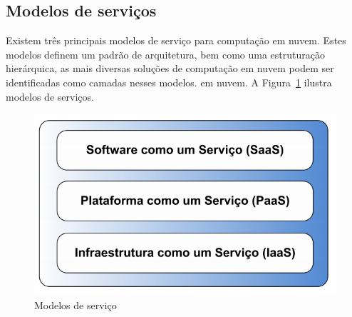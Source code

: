\documentclass[twoside,english,brazilian]{UNISINOSmonografia}
\begin{document}
\subsection{Modelos de serviços}
Existem três principais modelos de serviço para computação em nuvem. Estes modelos definem um padrão de arquitetura, bem como uma estruturação hierárquica, as mais diversas soluções de computação em nuvem podem ser identificadas como camadas nesses modelos. 
em nuvem. A Figura~\ref{fig:saas_paas} ilustra modelos de serviços.

\begin{figure}
	\caption{Modelos de serviço}
	\label{fig:saas_paas}
	\centering%
	\begin{minipage}{.4\textwidth}
		\includegraphics[width=\textwidth]{saas_paas}
	\end{minipage}
\end{figure}
\end{document}

